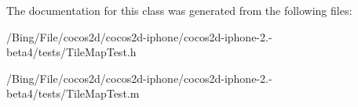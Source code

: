 The documentation for this class was generated from the following files\-:\begin{DoxyCompactItemize}
\item 
/\-Bing/\-File/cocos2d/cocos2d-\/iphone/cocos2d-\/iphone-\/2.-\/beta4/tests/Tile\-Map\-Test.\-h\item 
/\-Bing/\-File/cocos2d/cocos2d-\/iphone/cocos2d-\/iphone-\/2.-\/beta4/tests/Tile\-Map\-Test.\-m\end{DoxyCompactItemize}
